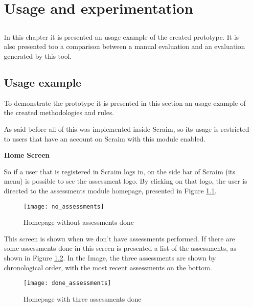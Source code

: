 \chapter{Usage and experimentation} \label{chap:usage}

\section*{}

In this chapter it is presented an usage example of the created prototype. It is also presented too a comparison between a manual evaluation and an evaluation generated by this tool.

\section{Usage example} \label{sec:usageexample}

To demonstrate the prototype it is presented in this section an usage example of the created methodologies and rules.

As said before all of this was implemented inside Scraim, so its usage is restricted to users that have an account on Scraim with this module enabled.

\vspace{10 mm}

\textbf{Home Screen}

So if a user that is registered in Scraim logs in, on the side bar of Scraim (its menu) is possible to see the assessment logo. By clicking on that logo, the user is directed to the assessments module homepage, presented in Figure \ref{fig:no_assessments}.

\begin{figure}[!htb]
	\begin{center}
		\leavevmode
		\texttt{[image: no\_assessments]}
		\caption{Homepage without assessments done}
		\label{fig:no_assessments}
	\end{center}
\end{figure}

This screen is shown when we don't have assessments performed. If there are some assessments done in this screen is presented a list of the assessments, as shown in Figure \ref{fig:done_assessments}. In the Image, the three assessments are shown by chronological order, with the most recent assessments on the bottom.

\begin{figure}[!htb]
	\begin{center}
		\leavevmode
		\texttt{[image: done\_assessments]}
		\caption{Homepage with three assessments done}
		\label{fig:done_assessments}
	\end{center}
\end{figure}


